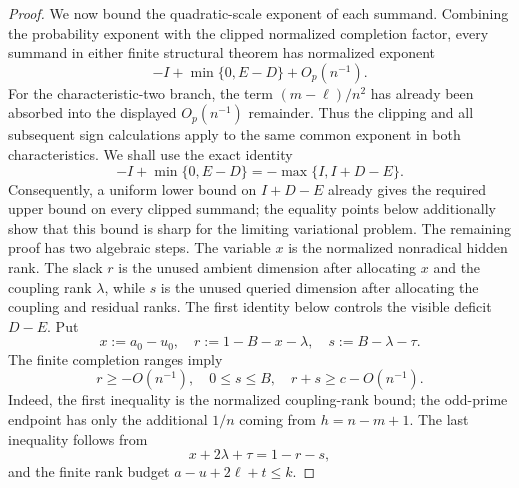 \documentclass[11pt]{article}
\newcommand{\1}{\mathbf 1}
\theoremstyle{plain}
\theoremstyle{definition}
\theoremstyle{remark}
\begin{document}
\begin{proof}
We now bound the quadratic-scale exponent of each summand.  Combining the
probability exponent with the clipped normalized completion factor, every
summand in either finite structural theorem has normalized exponent
\begin{equation}
 -I+\min\{0,E-D\}+O_p(n^{-1}).
 \label{eq:direct-finite-normalized-clipped-summand}
\end{equation}
For the characteristic-two branch, the term $(m-\ell)/n^2$ has already
been absorbed into the displayed $O_p(n^{-1})$ remainder.  Thus the clipping
and all subsequent sign calculations apply to the same common exponent in
both characteristics.  We shall use the exact identity
\begin{equation}
 -I+\min\{0,E-D\}=-\max\{I,I+D-E\}.
 \label{eq:direct-finite-clipping-max-identity}
\end{equation}
Consequently, a uniform lower bound on $I+D-E$ already gives the required
upper bound on every clipped summand; the equality points below additionally
show that this bound is sharp for the limiting variational problem.
The remaining proof has two algebraic steps.  The variable $x$ is the
normalized nonradical hidden rank.  The slack $r$ is the unused ambient
dimension after allocating $x$ and the coupling rank $\lambda$, while $s$ is
the unused queried dimension after allocating the coupling and residual
ranks.  The first identity below controls the visible deficit $D-E$.  Put
\begin{equation}
 x:=a_0-u_0,
 \quad r:=1-B-x-\lambda,
 \quad s:=B-\lambda-\tau.
 \label{eq:direct-finite-slacks}
\end{equation}
The finite completion ranges imply
\begin{equation}
 r\ge-O(n^{-1}),
 \quad 0\le s\le B,
 \quad r+s\ge c-O(n^{-1}).
 \label{eq:direct-finite-slack-ranges}
\end{equation}
Indeed, the first inequality is the normalized coupling-rank bound; the
odd-prime endpoint has only the additional $1/n$ coming from $h=n-m+1$.
The last inequality follows from
\begin{equation}
 x+2\lambda+\tau=1-r-s,
 \label{eq:direct-finite-rank-identity}
\end{equation}
and the finite rank budget $a-u+2\ell+t\le k$.


\end{proof}
\end{document}
